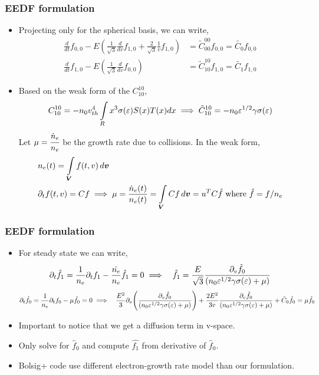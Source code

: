 \documentclass[mathserif, aspectratio=169]{beamer}
\newcommand{\vect}[1]{\boldsymbol{#1}}
\newcommand{\of}[1]{\mleft( #1 \mright)}
\newcommand{\myint}{\int\limits}
\newcommand{\vr}{v}
\newcommand{\diff}[1]{\, d#1}
\begin{document}
\begin{frame}
	\frametitle{EEDF formulation}
	\begin{itemize}
		\item Projecting only for the spherical basis, we can write, 
		\begin{align*}
			\frac{d}{dt} f_{0,0} - E 
			\left( \frac{1}{\sqrt{3}} \frac{d}{d\vr} f_{1,0} 
			+  \frac{2}{\sqrt{3}} \frac{1}{\vr} f_{1,0} \right) &= \tilde{C}^{00}_{00} f_{0,0} = \tilde{C_0} f_{0,0}
			\\
			\frac{d}{dt} f_{1,0} - E 
			\left( \frac{1}{\sqrt{3}} \frac{d}{d\vr} f_{0,0} \right) &=  \tilde{C}^{10}_{10} f_{1,0} = \tilde{C_1} f_{1,0}
		\end{align*}
		\item Based on the weak form of the $C^{10}_{10}$, 
		\tiny 
		\begin{align*}
		C^{10}_{10} = -n_0 v_{th}^4 \myint_{R} x^3 \sigma\of{\varepsilon} S(x) T(x) dx \implies  \tilde{C}^{10}_{10} = -n_0 \varepsilon^{1/2} \gamma \sigma\of{\varepsilon} 
		\end{align*} Let $\mu = \cfrac{\dot{n}_e}{n_e}$ be the growth rate due to collisions. In the weak form, 
		\begin{align*}
		&n_e\of{t} =\myint_{\vect{V}} f(t,v) \diff{\vect{v}} \\
		&\partial_t f(t,v) = C f \implies \mu = \frac{\dot{n}_e\of{t}}{n_e\of{t}} = \myint_{\vect{V}} C f \diff{\vect{v}} = u^T C \hat{f} \text{ where } \hat{f} = f/n_e
		\end{align*}
	\end{itemize}
\end{frame}

\begin{frame}
	\frametitle{EEDF formulation}
	\begin{itemize}
		\item For steady state we can write, 
		\begin{align*}
			&\partial_t \hat{f_1} = \frac{1}{n_e} \partial_t f_1 - \frac{\dot{n_e}}{n_e} \hat{f_1} =0 \implies 
			&\hat{f_1} = \frac{E}{\sqrt{3}} \frac{\partial_{v}\hat{f_0}}{(n_0 \varepsilon^{1/2}\gamma \sigma\of{\varepsilon} + \mu)}
		\end{align*}
		\begin{align*}
			&\partial_t \hat{f_0} = \frac{1}{n_e} \partial_t f_0 - \mu \hat{f_0} = 0  \implies
			&\frac{E^2}{3} \partial_{v} \of{\frac{\partial_v \hat f_0}{(n_0 \varepsilon^{1/2}\gamma \sigma\of{\varepsilon} + \mu)}} + \frac{2E^2}{3v} \frac{\partial_v \hat{f_0}}{(n_0 \varepsilon^{1/2}\gamma \sigma\of{\varepsilon} + \mu)} + \tilde C_0 \hat{f_0} = \mu \hat{f_0}\\
		\end{align*}
		\item Important to notice that we get a diffusion term in v-space. 
		\item Only solve for $\hat{f}_0$ and compute $\hat{f_1}$ from derivative of $\hat{f}_0$.
		\item Bolsig+ code use different electron-growth rate model than our formulation. 
	\end{itemize}
\end{frame}
\end{document}
